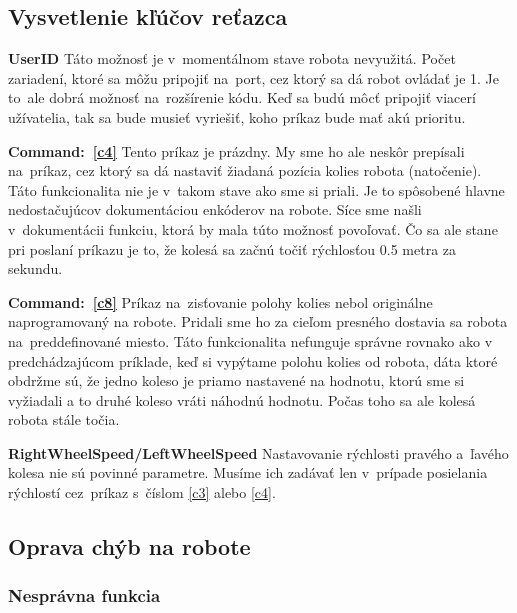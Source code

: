 \subsection{Vysvetlenie kľúčov reťazca}

\noindent \textbf{UserID} \newline
\indent Táto možnosť je v~momentálnom stave robota nevyužitá. Počet zariadení, ktoré sa môžu pripojiť na~port, cez ktorý sa dá robot ovládať
je 1. Je to~ale dobrá možnosť na~rozšírenie kódu. Keď sa budú môcť pripojiť viacerí užívatelia, tak sa bude musieť vyriešiť, koho príkaz
bude mať akú prioritu. \newline

\noindent \textbf{Command:~\ref{c4}} \newline
\indent Tento príkaz je prázdny. My sme ho ale neskôr prepísali na~príkaz, cez ktorý sa dá nastaviť žiadaná pozícia kolies robota (natočenie).
Táto funkcionalita nie je v~takom stave ako sme si priali. Je to spôsobené hlavne nedostačujúcov dokumentáciou enkóderov na robote. Síce sme našli
v~dokumentácii funkciu, ktorá by mala túto možnosť povoľovať. Čo sa ale stane pri poslaní príkazu je to, že kolesá sa začnú točiť rýchlosťou
0.5 metra za sekundu.\newline

\noindent \textbf{Command:~\ref{c8}} \newline
\indent Príkaz na~zisťovanie polohy kolies nebol originálne naprogramovaný na robote. Pridali sme ho za cieľom presného dostavia sa robota
na~preddefinované miesto. Táto funkcionalita nefunguje správne rovnako ako v predchádzajúcom príklade, keď si vypýtame polohu kolies od robota,
dáta ktoré obdržme sú, že jedno koleso je priamo nastavené na hodnotu, ktorú sme si vyžiadali a to druhé koleso vráti náhodnú hodnotu.
Počas toho sa ale kolesá robota stále točia.\newline

\noindent \textbf{RightWheelSpeed/LeftWheelSpeed} \newline
\indent Nastavovanie rýchlosti pravého a~ľavého kolesa nie sú povinné parametre. Musíme ich zadávať len v~prípade posielania rýchlostí
cez~príkaz s~číslom \ref{c3} alebo \ref{c4}.

\subsection{Oprava chýb na robote}

\subsubsection{Nesprávna funkcia}

